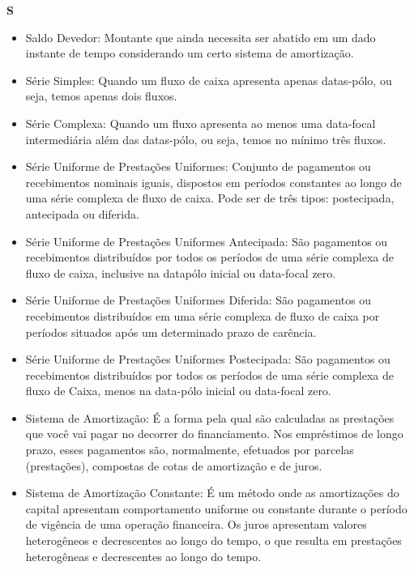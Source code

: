 \textbf{S}
\begin{itemize}
 \item Saldo Devedor:
    Montante que ainda necessita ser abatido em um dado instante de tempo considerando um certo sistema de amortização. 

\item Série Simples:
    Quando um fluxo de caixa apresenta apenas datas-pólo, ou seja, temos apenas dois fluxos. 

\item Série Complexa:
    Quando um fluxo apresenta ao menos uma data-focal intermediária além das datas-pólo, ou seja, temos no mínimo três fluxos. 

\item Série Uniforme de Prestações Uniformes:
    Conjunto de pagamentos ou recebimentos nominais iguais, dispostos em períodos constantes ao longo de uma série complexa de fluxo de caixa. Pode ser de três tipos: postecipada, antecipada ou diferida. 

\item Série Uniforme de Prestações Uniformes Antecipada:
    São pagamentos ou recebimentos distribuídos por todos os períodos de uma série complexa de fluxo de caixa, inclusive na datapólo inicial ou data-focal zero. 

\item Série Uniforme de Prestações Uniformes Diferida:
    São pagamentos ou recebimentos distribuídos em uma série complexa de fluxo de caixa por períodos situados após um determinado prazo de carência. 

\item Série Uniforme de Prestações Uniformes Postecipada:
    São pagamentos ou recebimentos distribuídos por todos os períodos de uma série complexa de fluxo de Caixa, menos na data-pólo inicial ou data-focal zero. 

\item Sistema de Amortização:
    É a forma pela qual são calculadas as prestações que você vai pagar no decorrer do financiamento. Nos empréstimos de longo prazo, esses pagamentos são, normalmente, efetuados por parcelas (prestações), compostas de cotas de amortização e de juros. 

\item Sistema de Amortização Constante:
    É um método onde as amortizações do capital apresentam comportamento uniforme ou constante durante o período de vigência de uma operação financeira. Os juros apresentam valores heterogêneos e decrescentes ao longo do tempo, o que resulta em prestações heterogêneas e decrescentes ao longo do tempo. 


\end{itemize}
